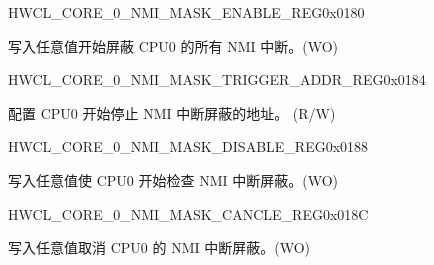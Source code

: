\begin{register}{H}{WCL\_CORE\_0\_NMI\_MASK\_ENABLE\_REG}{0x0180}\label{regdesc:WCLCORE0NMIMASKENABLEREG}
%
\regnewline%
\begin{regdesc}\begin{reglist}
\label{fielddesc:WCLCORE0NMIMASKENABLE}\item [WCL\_CORE\_0\_NMI\_MASK\_ENABLE] 写入任意值开始屏蔽 CPU0 的所有 NMI 中断。(WO)
\end{reglist}\end{regdesc}
\end{register}


\begin{register}{H}{WCL\_CORE\_0\_NMI\_MASK\_TRIGGER\_ADDR\_REG}{0x0184}\label{regdesc:WCLCORE0NMIMASKTRIGGERADDRREG}
%
\regnewline%
\begin{regdesc}\begin{reglist}
\label{fielddesc:WCLCORE0NMIMASKTRIGGERADDR}\item [WCL\_CORE\_0\_NMI\_MASK\_TRIGGER\_ADDR] 配置 CPU0 开始停止 NMI 中断屏蔽的地址。 (R/W)
\end{reglist}\end{regdesc}
\end{register}


\begin{register}{H}{WCL\_CORE\_0\_NMI\_MASK\_DISABLE\_REG}{0x0188}\label{regdesc:WCLCORE0NMIMASKDISABLEREG}
%
\regnewline%
\begin{regdesc}\begin{reglist}
\label{fielddesc:WCLCORE0NMIMASKDISABLE}\item [WCL\_CORE\_0\_NMI\_MASK\_DISABLE] 写入任意值使 CPU0 开始检查 NMI 中断屏蔽。(WO)
\end{reglist}\end{regdesc}
\end{register}


\begin{register}{H}{WCL\_CORE\_0\_NMI\_MASK\_CANCLE\_REG}{0x018C}\label{regdesc:WCLCORE0NMIMASKCANCLEREG}
%
\regnewline%
\begin{regdesc}\begin{reglist}
\label{fielddesc:WCLCORE0NMIMASKCANCEL}\item [WCL\_CORE\_0\_NMI\_MASK\_CANCEL] 写入任意值取消 CPU0 的 NMI 中断屏蔽。(WO)
\end{reglist}\end{regdesc}
\end{register}


